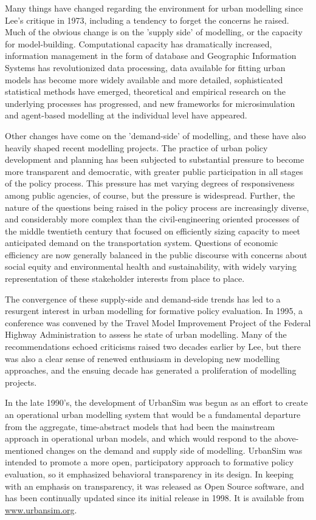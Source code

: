 \documentclass[12pt,a4paper]{article}
\begin{document}
Many things have changed regarding the environment for urban
modelling since Lee's critique in 1973, including a tendency to
forget the concerns he raised.  Much of the obvious change is on
the 'supply side' of modelling, or the capacity for
model-building. Computational capacity has dramatically increased,
information management in the form of database and Geographic
Information Systems has revolutionized data processing, data
available for fitting urban models has become more widely
available and more detailed, sophisticated statistical methods
have emerged, theoretical and empirical research on the underlying
processes has progressed, and new frameworks for microsimulation
and agent-based modelling at the individual level have appeared.

Other changes have come on the 'demand-side' of modelling, and
these have also heavily shaped recent modelling projects.  The
practice of urban policy development and planning has been
subjected to substantial pressure to become more transparent and
democratic, with greater public participation in all stages of the
policy process.  This pressure has met varying degrees of
responsiveness among public agencies, of course, but the pressure
is widespread.  Further, the nature of the questions being raised
in the policy process are increasingly diverse, and considerably
more complex than the civil-engineering oriented processes of the
middle twentieth century that focused on efficiently sizing
capacity to meet anticipated demand on the transportation system.
Questions of economic efficiency are now generally balanced in the
public discourse with concerns about social equity and
environmental health and sustainability, with widely varying
representation of these stakeholder interests from place to place.

The convergence of these supply-side and demand-side trends has
led to a resurgent interest in urban modelling for formative
policy evaluation. In 1995, a conference was convened by the
Travel Model Improvement Project of the Federal Highway
Administration to assess he state of urban modelling.  Many of the
recommendations echoed criticisms raised two decades earlier by
Lee, but there was also a clear sense of renewed enthusiasm in
developing new modelling approaches, and the ensuing decade has
generated a proliferation of modelling projects.

In the late 1990's, the development of UrbanSim  was begun as an
effort to create an operational urban modelling system that would
be a fundamental departure from the aggregate, time-abstract
models that had been the mainstream approach in operational urban
models, and which would respond to the above-mentioned changes on
the demand and supply side of modelling.  UrbanSim was intended to
promote a more open, participatory approach to formative policy
evaluation, so it emphasized behavioral transparency in its
design.  In keeping with an emphasis on transparency, it was
released as Open Source software, and has been continually updated
since its initial release in 1998.  It is available from
\url{www.urbansim.org}.
\end{document}
